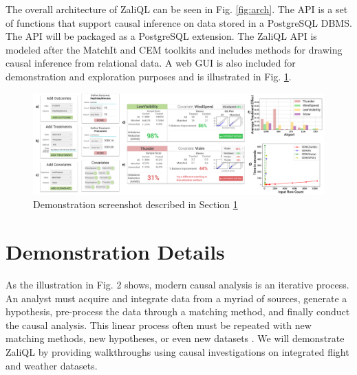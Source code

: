 The overall architecture of ZaliQL can be seen in Fig. \ref{fig:arch}. The API is a set of functions that support causal inference on data stored in a PostgreSQL DBMS. The API will be packaged as a PostgreSQL extension. The ZaliQL API is modeled after the MatchIt and CEM toolkits \cite{ho2005,iacus2009cem} and includes methods for drawing causal inference from relational data. A web GUI is also included for demonstration and exploration purposes and is illustrated in Fig. \ref{sfig:demo-tutorial}. 

\begin{figure} \centering
\hspace*{-.1cm}
\includegraphics[scale=0.16]{Figures/Demo-Tutorial.png}
\caption{Demonstration screenshot described in Section \ref{sec:dd}}
\label{sfig:demo-tutorial}
\end{figure}

\vspace{-.3cm}
\section{Demonstration Details}
\label{sec:dd}

As the illustration in Fig. 2 shows, modern causal analysis is an iterative process. An analyst must acquire and integrate data from a myriad of sources, generate a hypothesis, pre-process the data through a matching method, and finally conduct the causal analysis. This linear process often must be repeated with new matching methods, new hypotheses, or even new datasets \cite{IacKinPor09}. We will demonstrate ZaliQL by providing walkthroughs using causal investigations on integrated flight and weather datasets.


